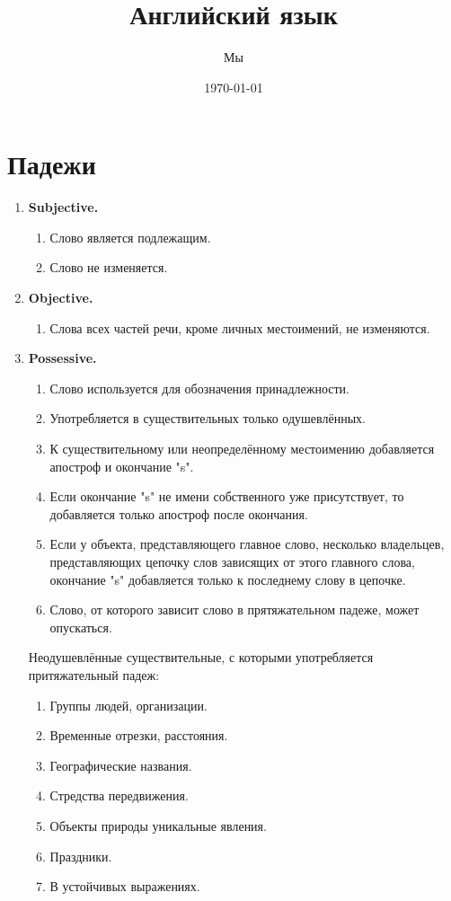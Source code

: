 \documentclass[oneside]{book}
\title{Английский язык}
\date{\today}
\author{Мы}
\begin{document}
	\maketitle

	\tableofcontents

	\chapter{Падежи}
	\begin{enumerate}
		\item \textbf{Subjective.}
		\begin{enumerate}
			\item Слово является подлежащим.
			\item Слово не изменяется.
		\end{enumerate}

		\item \textbf{Objective.}
		\begin{enumerate}
			\item Слова всех частей речи, кроме личных
			местоимений, не изменяются.
		\end{enumerate}

		\item \textbf{Possessive.}
		\begin{enumerate}
			\item Слово используется для обозначения
			принадлежности.

			\item Употребляется в существительных
			только одушевлённых.

			\item К существительному или неопределённому
			местоимению добавляется апостроф
			и окончание "s".

			\item Если окончание "s" не имени собственного
			уже присутствует, то добавляется
			только апостроф после окончания.

			\item Если у объекта, представляющего
			главное слово, несколько владельцев,
			представляющих цепочку слов зависящих от этого главного слова,
			окончание "s" добавляется
			только к последнему слову в цепочке.

			\item Слово, от которого зависит
			слово в прятяжательном падеже,
			может опускаться.
		\end{enumerate}

		Неодушевлённые существительные,
		с которыми употребляется
		притяжательный падеж:
		\begin{enumerate}
			\item Группы людей, организации.
			\item Временные отрезки, расстояния.
			\item Географические названия.
			\item Стредства передвижения.
			\item Объекты природы уникальные явления.
			\item Праздники.
			\item В устойчивых выражениях.
		\end{enumerate}
	\end{enumerate}
\end{document}
